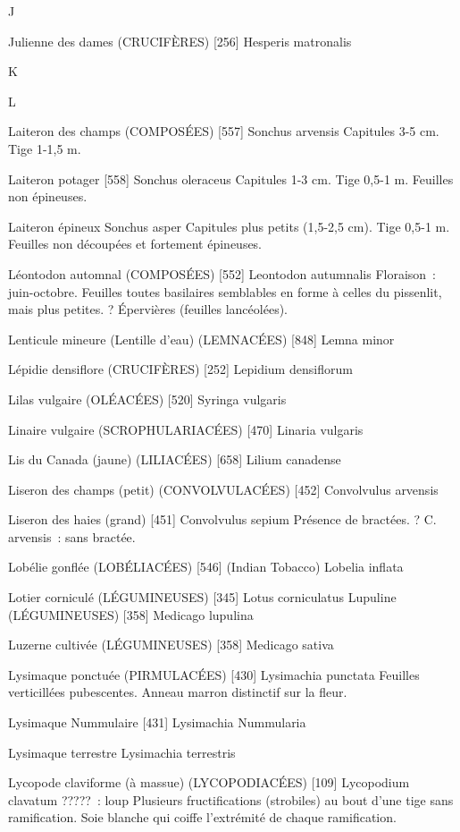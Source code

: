 \documentclass[book,12pt,a4paper,onecolumn,openany]{memoir}
\begin{document}
J

Julienne des dames (CRUCIFÈRES)  [256]
				Hesperis matronalis

K


L

Laiteron des champs (COMPOSÉES)  [557]
				Sonchus arvensis
Capitules 3-5 cm. Tige 1-1,5 m.

Laiteron potager  [558]
				Sonchus oleraceus
Capitules 1-3 cm. Tige 0,5-1 m. Feuilles non épineuses.

Laiteron épineux
				Sonchus asper
Capitules plus petits (1,5-2,5 cm). Tige 0,5-1 m. Feuilles non découpées et fortement épineuses.

Léontodon automnal (COMPOSÉES)  [552]
				Leontodon autumnalis
Floraison : juin-octobre. Feuilles toutes basilaires semblables en forme à celles du pissenlit, mais plus petites. ? Épervières (feuilles lancéolées).

Lenticule mineure (Lentille d’eau) (LEMNACÉES)  [848]
				Lemna minor


Lépidie densiflore (CRUCIFÈRES)  [252]
				Lepidium densiflorum

Lilas vulgaire (OLÉACÉES)  [520]
				Syringa vulgaris

Linaire vulgaire (SCROPHULARIACÉES)  [470]
				Linaria vulgaris

Lis du Canada (jaune) (LILIACÉES)  [658]
				Lilium canadense

Liseron des champs (petit) (CONVOLVULACÉES)  [452]
				Convolvulus arvensis

Liseron des haies (grand)  [451]
				Convolvulus sepium
Présence de bractées. ? C. arvensis : sans bractée.

Lobélie gonflée (LOBÉLIACÉES)  [546] (Indian Tobacco)
				Lobelia inflata

Lotier corniculé (LÉGUMINEUSES)  [345]
				Lotus corniculatus
Lupuline (LÉGUMINEUSES)  [358]
				Medicago lupulina

Luzerne cultivée (LÉGUMINEUSES)  [358]
				Medicago sativa

Lysimaque ponctuée (PIRMULACÉES)  [430]
				Lysimachia punctata
Feuilles verticillées pubescentes.
Anneau marron distinctif sur la fleur.

Lysimaque Nummulaire  [431]
				Lysimachia Nummularia

Lysimaque terrestre
				Lysimachia terrestris

Lycopode claviforme (à massue) (LYCOPODIACÉES)  [109]
				Lycopodium clavatum
????? : loup
Plusieurs fructifications (strobiles) au bout d’une tige sans ramification.
Soie blanche qui coiffe l’extrémité de chaque ramification.
\end{document}
